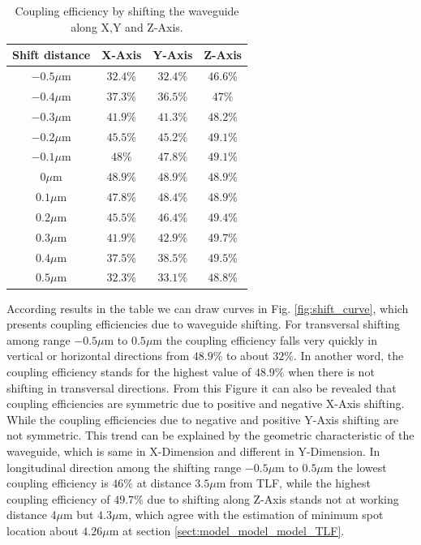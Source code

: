 \begin{table}[!ht]
\caption{Coupling efficiency by shifting the waveguide along X,Y and Z-Axis.}
\centering
\begin{tabular}{c|ccc}
\hline
Shift distance & X-Axis & Y-Axis & Z-Axis \\
\hline
$-0.5\mu$m 		&$32.4\%$	&$32.4\%$&$46.6\%$	\\
$-0.4\mu$m		&$37.3\%$	&$36.5\%$&$47\%$	\\
$-0.3\mu$m 		&$41.9\%$	&$41.3\%$&$48.2\%$	\\
$-0.2\mu$m	  &$45.5\%$	&$45.2\%$&$49.1\%$	\\
$-0.1\mu$m		&$48\%$	&$47.8\%$&$49.1\%$	\\
$0\mu$m			  &$48.9\%$	&$48.9\%$&$48.9\%$	\\
$0.1\mu$m			&$47.8\%$	&$48.4\%$&$48.9\%$	\\
$0.2\mu$m			&$45.5\%$	&$46.4\%$&$49.4\%$	\\
$0.3\mu$m			&$41.9\%$	&$42.9\%$&$49.7\%$	\\
$0.4\mu$m			&$37.5\%$	&$38.5\%$&$49.5\%$	\\
$0.5\mu$m			&$32.3\%$	&$33.1\%$&$48.8\%$	\\
\hline
\end{tabular}
\label{tab:shift_result}
\end{table}
According results in the table we can draw curves in Fig. \ref{fig:shift_curve}, which presents coupling efficiencies due to waveguide shifting. For transversal shifting among range $-0.5\mu$m to $0.5\mu$m the coupling efficiency falls very quickly in vertical or horizontal directions from $48.9\%$ to about $32\%$.  In another word, the coupling efficiency stands for the highest value of $48.9\%$ when there is not shifting in transversal directions. From this Figure it can also be revealed that coupling efficiencies are symmetric due to positive and negative X-Axis shifting. While the coupling efficiencies due to negative and positive Y-Axis shifting are not symmetric. This trend can be explained by the geometric characteristic of the waveguide, which is same in X-Dimension and different in Y-Dimension.  In longitudinal direction among the shifting range $-0.5\mu$m to $0.5\mu$m the lowest coupling efficiency is $46\%$ at distance $3.5\mu$m from TLF, while the highest coupling efficiency of $49.7\%$ due to shifting along Z-Axis stands not at working distance $4\mu$m but $4.3\mu$m, which agree with the estimation of minimum spot location about $4.26\mu$m at section \ref{sect:model_model_model_TLF}. \\


